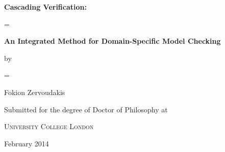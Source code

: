 \thispagestyle{empty}

\vspace*{\fill}

\begin{center}
{\Huge\textbf{Cascading Verification:}}

\parskip=\bigskipamount

{\LARGE\textbf{An Integrated Method for Domain-Specific Model Checking}}

{\large
by

\parskip=\medskipamount

Fokion Zervoudakis

Submitted for the degree of Doctor of Philosophy at

\textsc{University College London}

February 2014
}
\end{center}

\vspace*{\fill}

\newpage
